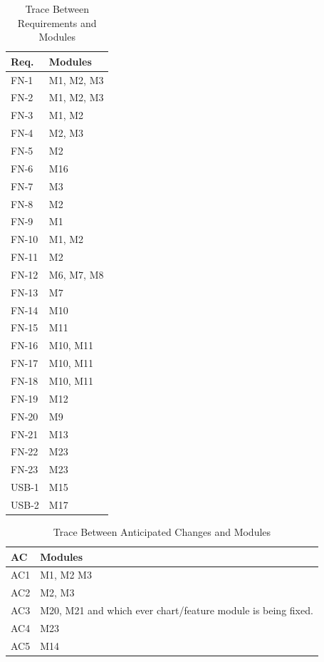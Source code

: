 \documentclass[12pt, titlepage]{article}
\begin{document}
\begin{table}[H]
\centering
\begin{tabular}{p{} p{}}
\toprule
\textbf{Req.} & \textbf{Modules}\\
\midrule
FN-1 & M1, M2, M3\\
FN-2 & M1, M2, M3\\
FN-3 & M1, M2\\
FN-4 & M2, M3\\
FN-5 & M2 \\
FN-6 & M16\\
FN-7 & M3\\
FN-8 & M2\\
FN-9 & M1\\
FN-10 & M1, M2 \\
FN-11 & M2\\
FN-12 & M6, M7, M8\\
FN-13 & M7\\
FN-14 & M10\\
FN-15 & M11\\
FN-16 & M10, M11\\
FN-17 & M10, M11\\
FN-18 & M10, M11\\
FN-19 & M12\\
FN-20 & M9\\
FN-21 & M13\\
FN-22 & M23\\
FN-23 & M23\\
USB-1 & M15\\
USB-2 & M17\\
\bottomrule
\end{tabular}
\caption{Trace Between Requirements and Modules}
\label{TblRT}
\end{table}


\begin{table}[H]
\centering
\begin{tabular}{p{} p{}}
\toprule
\textbf{AC} & \textbf{Modules}\\
\midrule
AC1 & M1, M2 M3\\
AC2 & M2, M3\\
AC3 & M20, M21 and which ever chart/feature module is being fixed.\\
AC4 & M23 \\
AC5 & M14 \\

\bottomrule
\end{tabular}
\caption{Trace Between Anticipated Changes and Modules}
\label{TblACT}
\end{table}
\end{document}
